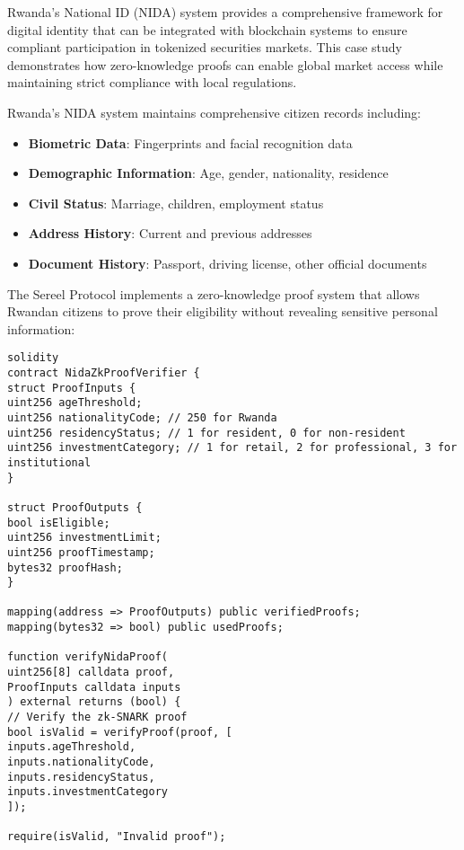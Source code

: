 \documentclass[12pt]{article}
\begin{document}
{{{Rwanda's National ID (NIDA) system provides a comprehensive framework for digital identity that can be integrated with blockchain systems to ensure compliant participation in tokenized securities markets. This case study demonstrates how zero-knowledge proofs can enable global market access while maintaining strict compliance with local regulations.


Rwanda's NIDA system maintains comprehensive citizen records including:

\begin{itemize}
	\item \textbf{Biometric Data}: Fingerprints and facial recognition data
	\item \textbf{Demographic Information}: Age, gender, nationality, residence
	\item \textbf{Civil Status}: Marriage, children, employment status
	\item \textbf{Address History}: Current and previous addresses
	\item \textbf{Document History}: Passport, driving license, other official documents

\end{itemize}

The Sereel Protocol implements a zero-knowledge proof system that allows Rwandan citizens to prove their eligibility without revealing sensitive personal information:


\begin{lstlisting}
solidity
contract NidaZkProofVerifier {
struct ProofInputs {
uint256 ageThreshold;
uint256 nationalityCode; // 250 for Rwanda
uint256 residencyStatus; // 1 for resident, 0 for non-resident
uint256 investmentCategory; // 1 for retail, 2 for professional, 3 for institutional
}

struct ProofOutputs {
bool isEligible;
uint256 investmentLimit;
uint256 proofTimestamp;
bytes32 proofHash;
}

mapping(address => ProofOutputs) public verifiedProofs;
mapping(bytes32 => bool) public usedProofs;

function verifyNidaProof(
uint256[8] calldata proof,
ProofInputs calldata inputs
) external returns (bool) {
// Verify the zk-SNARK proof
bool isValid = verifyProof(proof, [
inputs.ageThreshold,
inputs.nationalityCode,
inputs.residencyStatus,
inputs.investmentCategory
]);

require(isValid, "Invalid proof");


\end{lstlisting}}}}
\end{document}

